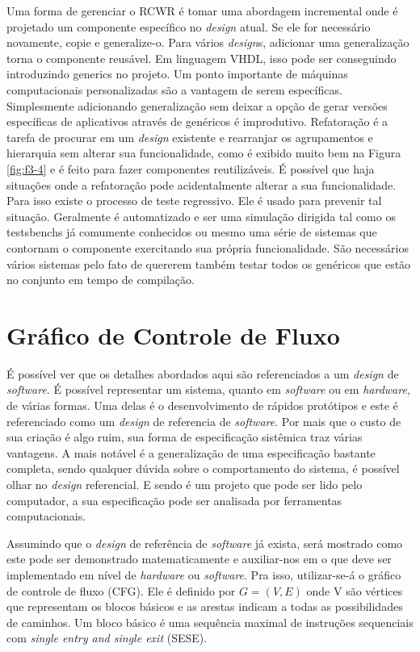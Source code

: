 Uma forma de gerenciar o RCWR é tomar uma abordagem incremental onde é projetado um componente específico no \textit{design} atual. Se ele for necessário novamente, copie e generalize-o. Para vários \textit{design}s, adicionar uma generalização torna o componente reusável. Em linguagem VHDL, isso pode ser conseguindo introduzindo generics no projeto. Um ponto importante de máquinas computacionais personalizadas são a vantagem de serem específicas. Simplesmente adicionando generalização sem deixar a opção de gerar versões específicas de aplicativos através de genéricos é improdutivo. Refatoração é a tarefa de procurar em um \textit{design} existente e rearranjar os agrupamentos e hierarquia sem alterar sua funcionalidade, como é exibido muito bem na Figura \ref{fig:f3-4} e é feito para fazer componentes reutilizáveis. É possível que haja situações onde a refatoração pode acidentalmente alterar a sua funcionalidade. Para isso existe o processo de teste regressivo. Ele é usado para prevenir tal situação. Geralmente é automatizado e ser uma simulação dirigida tal como os testsbenchs já comumente conhecidos ou mesmo uma série de sistemas que contornam o componente exercitando sua própria funcionalidade. São necessários vários sistemas pelo fato de quererem também testar todos os genéricos que estão no conjunto em tempo de compilação.


\section{Gráfico de Controle de Fluxo}

É possível ver que os detalhes abordados aqui são referenciados a um \textit{design} de \textit{software}. É possível representar um sistema, quanto em \textit{software} ou em \textit{hardware}, de várias formas. Uma delas é o desenvolvimento de rápidos protótipos e este é referenciado como um \textit{design} de referencia de \textit{software}. Por mais que o custo de sua criação é algo ruim, sua forma de especificação sistêmica traz várias vantagens. A mais notável é a generalização de uma especificação bastante completa, sendo qualquer dúvida sobre o comportamento do sistema, é possível olhar no \textit{design} referencial. E sendo é um projeto que pode ser lido pelo computador, a sua especificação pode ser analisada por ferramentas computacionais.

Assumindo que o \textit{design} de referência de \textit{software} já exista, será mostrado como este pode ser demonstrado matematicamente e auxiliar-nos em o que deve ser implementado em nível de \textit{hardware} ou \textit{software}. Pra isso, utilizar-se-á o gráfico de controle de fluxo (CFG). Ele é definido por $ G = (V, E) $ onde V são vértices que representam os blocos básicos e as arestas indicam a todas as possibilidades de caminhos. Um bloco básico é uma sequência maximal de instruções sequenciais com \textit{single entry and single exit} (SESE).

